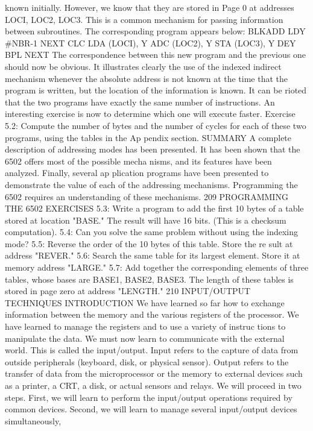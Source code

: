 known initially. However, we know that they are stored in Page 0
at addresses LOCI, LOC2, LOC3. This is a common mechanism
for passing information between subroutines. The corresponding
program appears below:
BLKADD LDY #NBR-1
NEXT CLC
LDA (LOCI), Y
ADC (LOC2), Y
STA (LOC3), Y
DEY
BPL NEXT
The correspondence between this new program and the previous
one should now be obvious. It illustrates clearly the use of the
indexed indirect mechanism whenever the absolute address is not
known at the time that the program is written, but the location of the
information is known. It can be rioted that the two programs
have exactly the same number of instructions. An interesting
exercise is now to determine which one will execute faster.
Exercise 5.2: Compute the number of bytes and the number of
cycles for each of these two programs, using the tables in the Ap
pendix section.
SUMMARY
A complete description of addressing modes has been presented.
It has been shown that the 6502 offers most of the possible mecha
nisms, and its features have been analyzed. Finally, several ap
plication programs have been presented to demonstrate the value
of each of the addressing mechanisms. Programming the 6502
requires an understanding of these mechanisms.
209
PROGRAMMING THE 6502
EXERCISES
5.3: Write a program to add the first 10 bytes of a table stored at
location "BASE." The result will have 16 bits. (This is a
checksum computation).
5.4: Can you solve the same problem without using the indexing
mode?
5.5: Reverse the order of the 10 bytes of this table. Store the re
sult at address "REVER."
5.6: Search the same table for its largest element. Store it at
memory address "LARGE."
5.7: Add together the corresponding elements of three tables,
whose bases are BASE1, BASE2, BASE3. The length of
these tables is stored in page zero at address "LENGTH."
210
INPUT/OUTPUT TECHNIQUES
INTRODUCTION
We have learned so far how to exchange information between the
memory and the various registers of the processor. We have
learned to manage the registers and to use a variety of instruc
tions to manipulate the data. We must now learn to communicate
with the external world. This is called the input/output.
Input refers to the capture of data from outside peripherals
(keyboard, disk, or physical sensor). Output refers to the transfer
of data from the microprocessor or the memory to external devices
such as a printer, a CRT, a disk, or actual sensors and relays.
We will proceed in two steps. First, we will learn to perform the
input/output operations required by common devices. Second, we
will learn to manage several input/output devices simultaneously,

